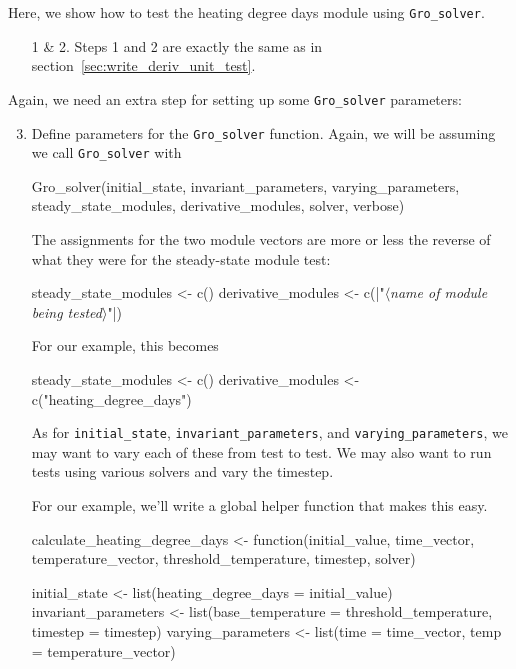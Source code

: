 \documentclass{article}\usepackage[]{graphicx}\usepackage[]{color}
\newcommand{\Rcode}[1]{\lstinline[style=Rstyle]{#1}}
\newcommand{\stringplaceholder}[1]{{\color{stringcolor}"$\langle$\textrm{\textit{#1}}$\rangle$"}}
\begin{document}
\begin{appendices}
Here, we show how to test the heating degree days module using \Rcode{Gro_solver}.

\begin{itemize}

\item[1 \& 2.] Steps 1 and 2 are exactly the same as in
        section~\ref{sec:write_deriv_unit_test}.

\end{itemize}

Again, we need an extra step for setting up some \Rcode{Gro_solver} parameters:

\begin{enumerate}
\setcounter{enumi}{2}

\item Define parameters for the \Rcode{Gro_solver} function.  Again,
  we will be assuming we call \Rcode{Gro_solver} with
  \begin{Rlisting}[4]
    Gro_solver(initial_state, invariant_parameters, varying_parameters,
               steady_state_modules, derivative_modules, solver, verbose)
  \end{Rlisting}

  The assignments for the two module vectors are more or less the
  reverse of what they were for the steady-state module test:
  \begin{Rlisting}[4]
    steady_state_modules <- c()
    derivative_modules <- c(|\stringplaceholder{name of module being tested}|)
  \end{Rlisting}

  For our example, this becomes
  \begin{Rexample}[4]
    steady_state_modules <- c()
    derivative_modules <- c("heating_degree_days")
  \end{Rexample}

  As for \Rcode{initial_state}, \Rcode{invariant_parameters}, and
  \Rcode{varying_parameters}, we may want to vary each of these from
  test to test.  We may also want to run tests using various solvers
  and vary the timestep.

  For our example, we'll write a global helper function that makes this easy.

  \begin{Rexample}[4]
    calculate_heating_degree_days <- function(initial_value, time_vector, temperature_vector, threshold_temperature, timestep, solver) {
      initial_state <- list(heating_degree_days = initial_value)
      invariant_parameters <- list(base_temperature = threshold_temperature, timestep = timestep)
      varying_parameters <- list(time = time_vector, temp = temperature_vector)

}
\end{Rexample}
\end{enumerate}
\end{appendices}
\end{document}
